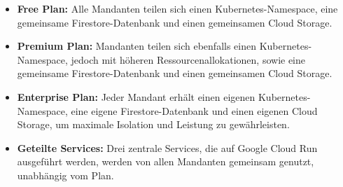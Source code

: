 \begin{itemize}
	\item \textbf{Free Plan:} Alle Mandanten teilen sich einen Kubernetes-Namespace, eine gemeinsame Firestore-Datenbank und einen gemeinsamen Cloud Storage.
	\item \textbf{Premium Plan:} Mandanten teilen sich ebenfalls einen Kubernetes-Namespace, jedoch mit höheren Ressourcenallokationen, sowie eine gemeinsame Firestore-Datenbank und einen gemeinsamen Cloud Storage.
	\item \textbf{Enterprise Plan:} Jeder Mandant erhält einen eigenen Kubernetes-Namespace, eine eigene Firestore-Datenbank und einen eigenen Cloud Storage, um maximale Isolation und Leistung zu gewährleisten.
	\item \textbf{Geteilte Services:} Drei zentrale Services, die auf Google Cloud Run ausgeführt werden, werden von allen Mandanten gemeinsam genutzt, unabhängig vom Plan.
\end{itemize}


